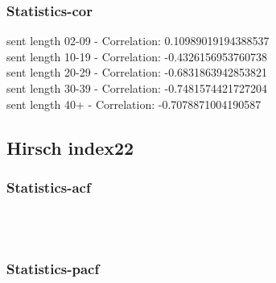 \documentclass{article}%
\begin{document}
%
\newpage%
\subsubsection{Statistics{-}cor}%
\label{ssubsec:Statistics{-}cor}%
\noindent%
sent length 02-09 - Correlation: 0.10989019194388537\\%
sent length 10-19 - Correlation: -0.4326156953760738\\%
sent length 20-29 - Correlation: -0.6831863942853821\\%
sent length 30-39 - Correlation: -0.7481574421727204\\%
sent length 40+ - Correlation: -0.7078871004190587\\

%
\newpage

%
\subsection{Hirsch index22}%
\label{subsec:Hirschindex22}%
\subsubsection{Statistics{-}acf}%
\label{ssubsec:Statistics{-}acf}%


\begin{figure}[ht]%
\centering%
\setlength{\abovecaptionskip}{-35pt}%
%
%
\\%
%
%
\\%
%
\end{figure}

%
\newpage%
\subsubsection{Statistics{-}pacf}%
\label{ssubsec:Statistics{-}pacf}%
\end{document}
